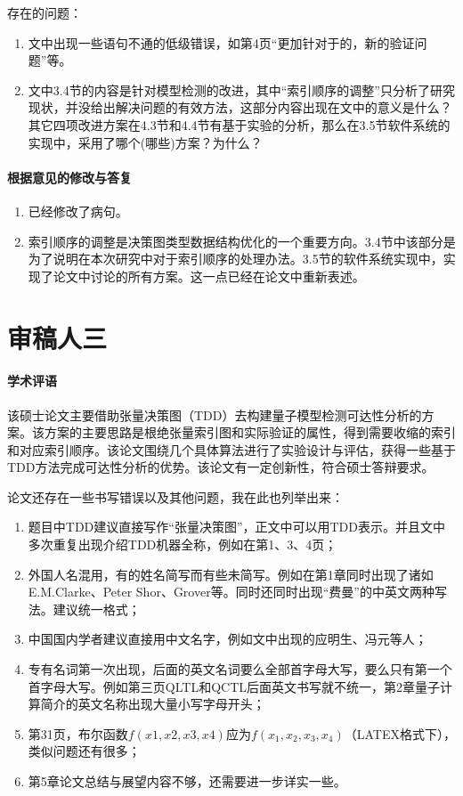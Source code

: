 \documentclass[10.5pt]{article} %
\begin{document}
存在的问题：
\begin{enumerate}
    \item 文中出现一些语句不通的低级错误，如第4页“更加针对于的，新的验证问题”等。
    \item 文中3.4节的内容是针对模型检测的改进，其中“索引顺序的调整”只分析了研究现状，并没给出解决问题的有效方法，这部分内容出现在文中的意义是什么？其它四项改进方案在4.3节和4.4节有基于实验的分析，那么在3.5节软件系统的实现中，采用了哪个(哪些)方案？为什么？
\end{enumerate}

\paragraph{根据意见的修改与答复}
\begin{enumerate}
    \item 已经修改了病句。
    \item 索引顺序的调整是决策图类型数据结构优化的一个重要方向。3.4节中该部分是为了说明在本次研究中对于索引顺序的处理办法。3.5节的软件系统实现中，实现了论文中讨论的所有方案。这一点已经在论文中重新表述。
\end{enumerate}
\section*{审稿人三}
\paragraph{学术评语}该硕士论文主要借助张量决策图（TDD）去构建量子模型检测可达性分析的方案。该方案的主要思路是根绝张量索引图和实际验证的属性，得到需要收缩的索引和对应索引顺序。该论文围绕几个具体算法进行了实验设计与评估，获得一些基于TDD方法完成可达性分析的优势。该论文有一定创新性，符合硕士答辩要求。

论文还存在一些书写错误以及其他问题，我在此也列举出来：
\begin{enumerate}
    \item 题目中TDD建议直接写作“张量决策图”，正文中可以用TDD表示。并且文中多次重复出现介绍TDD机器全称，例如在第1、3、4页；
    \item 外国人名混用，有的姓名简写而有些未简写。例如在第1章同时出现了诸如E.M.Clarke、Peter Shor、Grover等。同时还同时出现“费曼”的中英文两种写法。建议统一格式；
    \item 中国国内学者建议直接用中文名字，例如文中出现的应明生、冯元等人；
    \item 专有名词第一次出现，后面的英文名词要么全部首字母大写，要么只有第一个首字母大写。例如第三页QLTL和QCTL后面英文书写就不统一，第2章量子计算简介的英文名称出现大量小写字母开头；
    \item 第31页，布尔函数$f(x1,x2,x3,x4)$应为$f(x_1,x_2,x_3,x_4) $（LATEX格式下），类似问题还有很多；
    \item 第5章论文总结与展望内容不够，还需要进一步详实一些。
\end{enumerate}
\end{document}
